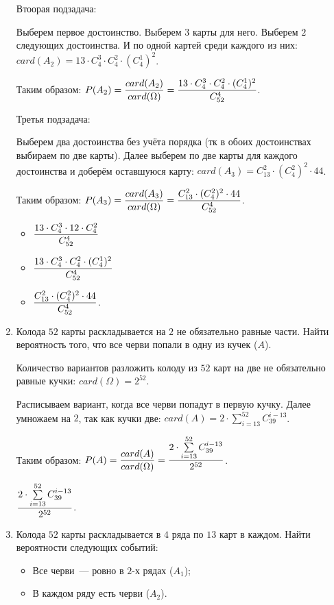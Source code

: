 \documentclass{article}
\begin{document}
\begin{enumerate}
    Втоорая подзадача:

    Выберем первое достоинство. Выберем $3$ карты для него. Выберем $2$ следующих достоинства. И по одной картей среди каждого из них: $card(A_2) = 13 \cdot C_4^3 \cdot C_4^2 \cdot (C_4^1) ^ 2$.

    Таким образом: $\displaystyle{P(A_2) = \frac{card(A_2)}{card(\Omega)} = \frac{13 \cdot C_4^3 \cdot C_4^2 \cdot (C_4^1) ^ 2}{C_{52}^4}}$. 

    Третья подзадача:

    Выберем два достоинства без учёта порядка (тк в обоих достоинствах выбираем по две карты). Далее выберем по две карты для каждого достоинства и доберём оставшуюся карту: $card(A_3) = C_{13}^2 \cdot (C_4^2) ^ 2 \cdot 44$.

    Таким образом: $\displaystyle{P(A_3) = \frac{card(A_3)}{card(\Omega)} = \frac{C_{13}^2 \cdot (C_4^2) ^ 2 \cdot 44}{C_{52}^4}}$.

    \answer{}

    \begin{itemize}
        \item $\displaystyle{\frac{13 \cdot C_4^3 \cdot 12 \cdot C_4^2}{C_{52}^4}}$
        \item $\displaystyle{\frac{13 \cdot C_4^3 \cdot C_4^2 \cdot (C_4^1) ^ 2}{C_{52}^4}}$
        \item $\displaystyle{\frac{C_{13}^2 \cdot (C_4^2) ^ 2 \cdot 44}{C_{52}^4}}$.
    \end{itemize}

    \item Колода $52$ карты раскладывается на $2$ не обязательно равные части. Найти вероятность того, что все черви попали в одну из кучек ($A$).

    \solution{}

    Количество вариантов разложить колоду из $52$ карт на две не обязательно равные кучки: $card(\Omega) = 2 ^ {52}$.

    Расписываем вариант, когда все черви попадут в первую кучку. Далее умножаем на $2$, так как кучки две: $card(A) = 2 \cdot \sum\limits_{i = 13}^{52} C_{39}^{i - 13}$.

    Таким образом: $\displaystyle{P(A) = \frac{card(A)}{card(\Omega)} = \frac{2 \cdot \sum\limits_{i = 13}^{52} C_{39}^{i - 13}}{2 ^ {52}}}$.
    
    \answer{} $\displaystyle{\frac{2 \cdot \sum\limits_{i = 13}^{52} C_{39}^{i - 13}}{2 ^ {52}}}$.
    
    \item Колода $52$ карты раскладывается в $4$ ряда по $13$ карт в каждом. Найти вероятности следующих событий:
    \begin{itemize}
        \item Все черви~--- ровно в $2$-х рядах ($A_1$);
        \item В каждом ряду есть черви ($A_2$).
    \end{itemize}
    

\end{enumerate}
\end{document}
